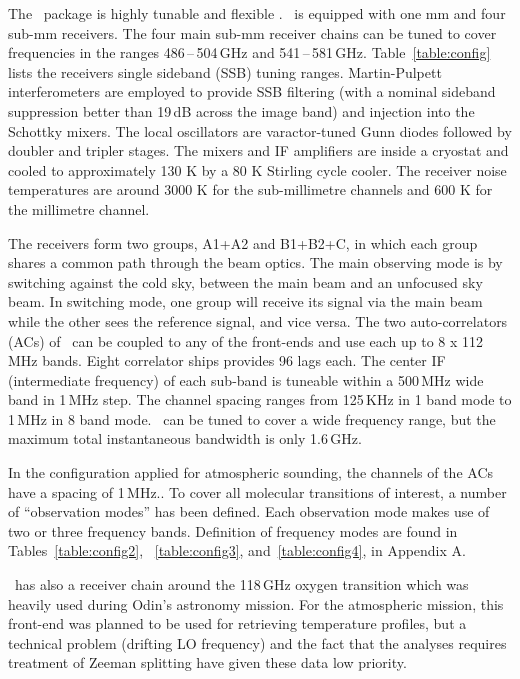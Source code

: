 The \smr\ package is highly tunable and flexible \citep{frisk:theod:03}.
\smr\ is equipped with one mm and four sub-mm receivers.
The four main sub-mm receiver chains can be tuned to cover
frequencies in the ranges 486\,--\,504\,GHz and 541\,--\,581\,GHz.
Table~\ref{table:config} lists the receivers single sideband (SSB) tuning ranges.
Martin-Pulpett interferometers are employed to provide SSB filtering 
(with a nominal sideband suppression better than 19\,dB across
the image band) and injection into the Schottky mixers.
The local oscillators are varactor-tuned Gunn diodes followed by
doubler and tripler stages. The mixers and IF amplifiers are inside a cryostat and
cooled to approximately 130 K by a 80 K Stirling cycle cooler. The receiver
noise temperatures are around 3000 K for
the sub-millimetre channels and 600 K for the millimetre channel.

The receivers form two groups, A1+A2 and B1+B2+C, in which each group shares
a common path through the beam optics. 
The main observing mode is by switching against the cold sky, between the
main beam and an unfocused sky beam. In switching mode, one group will
receive its signal via the main beam while the other sees the reference signal,
and vice versa.
The two auto-correlators (ACs) of \smr\ can be coupled to any of the front-ends
and use each up to 8 x 112 MHz bands.
Eight correlator ships provides 96 lags each.
The center IF (intermediate frequency) of each sub-band is tuneable
within a 500\,MHz wide band in 1\,MHz step. The channel spacing
ranges from 125\,KHz in 1 band mode to 1\,MHz in 8 band mode.
\smr\ can be tuned to cover a wide frequency range, but the maximum total instantaneous
bandwidth is only 1.6\,GHz. 

In the configuration applied for
atmospheric sounding, the channels of the ACs have a spacing of 1\,MHz..
To cover all molecular transitions of interest, a 
number of ``observation modes'' has been defined. Each observation mode makes
use of two or three frequency bands. 
Definition of frequency modes are found in Tables~\ref{table:config2}, 
~\ref{table:config3}, and~\ref{table:config4}, in Appendix A.

\smr\ has also a receiver chain around the 118\,GHz oxygen transition which was
heavily used during Odin's astronomy mission. For the atmospheric mission, this
front-end was planned to be used for retrieving temperature profiles, but a
technical problem (drifting LO frequency) and the fact that the analyses
requires treatment of Zeeman splitting have given these data low priority. 

